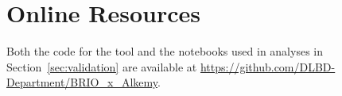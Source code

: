 \documentclass[
]{ceurart}
\begin{document}


\appendix

\section{Online Resources}

Both the code for the tool and the notebooks used in analyses in Section~\ref{sec:validation} are available at \href{https://github.com/DLBD-Department/BRIO_x_Alkemy}{https://github.com/DLBD-Department/BRIO\_x\_Alkemy}.
\end{document}
